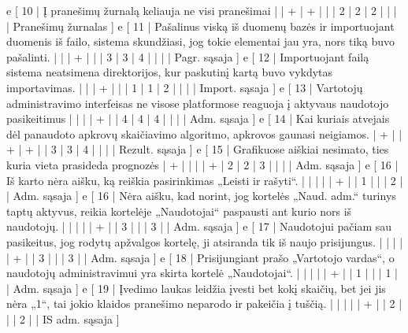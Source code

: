 {  e [ 10  | Į pranešimų žurnalą keliauja ne visi pranešimai     
                    |   | + | + |   |   | 2 | 2 | 2 |   |   |      | Pranešimų žurnalas ]
  e [ 11  | Pašalinus viską iš duomenų bazės ir importuojant duomenis iš failo,
  sistema skundžiasi, jog tokie elementai jau yra, nors tiką buvo pašalinti.     
                    |   |   | + |   |   | 3 | 3 | 4 |   |   |      | Pagr. sąsaja ]
  e [ 12  | Importuojant failą sistema neatsimena direktorijos, kur paskutinį
  kartą buvo vykdytas importavimas.   
                    |   |   | + |   |   | 1 | 1 | 2 |   |   |      | Import. sąsaja ]
  e [ 13  | Vartotojų administravimo interfeisas ne visose platformose reaguoja į
  aktyvaus naudotojo pasikeitimus  
                    |   |   |   | + |   | 4 | 4 | 4 |   |   |      | Adm. sąsaja ]
  e [ 14  | Kai kuriais atvejais dėl panaudoto apkrovų skaičiavimo algoritmo,
  apkrovos gaunasi neigiamos.
                    | + |   | + | + |   | 3 | 3 | 4 |   |   |      | Rezult. sąsaja ]
  e [ 15 | Grafikuose aiškiai nesimato, ties kuria vieta prasideda prognozės
                    | + |   |   |   | + | 2 | 2 | 3 |   |   |      | Adm. sąsaja ]
  e [ 16 | Iš karto nėra aišku, ką reiškia pasirinkimas „Leisti ir rašyti“.
                    |   |   |   |   | + |   | 1 |   |   | 2 |      | Adm. sąsaja ]
  e [ 16 | Nėra aišku, kad norint, jog kortelės „Naud. adm.“ turinys taptų aktyvus,
  reikia kortelėje „Naudotojai“ paspausti ant kurio nors iš naudotojų.
                    |   |   |   |   | + |   | 3 |   |   | 3 |      | Adm. sąsaja ]
  e [ 17 | Naudotojui pačiam sau pasikeitus, jog rodytų apžvalgos kortelę, ji
  atsiranda tik iš naujo prisijungus.
                    |   |   |   |   | + |   | 3 |   |   | 3 |      | Adm. sąsaja ]
  e [ 18 | Prisijungiant prašo „Vartotojo vardas“, o naudotojų administravimui
  yra skirta kortelė „Naudotojai“.
                    |   |   |   |   | + |   | 1 |   |   | 1 |      | Adm. sąsaja ]
  e [ 19 | Įvedimo laukas leidžia įvesti bet kokį skaičių, bet jei jis nėra
  „1“, tai jokio klaidos pranešimo neparodo ir pakeičia į tuščią.
                    |   |   |   |   | + |   | 2 |   |   | 2 |      | IS adm. sąsaja ]
}
